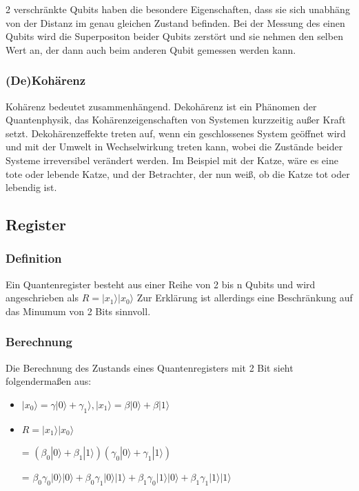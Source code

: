 2 verschränkte Qubits haben die besondere Eigenschaften, dass sie sich unabhäng von der Distanz im genau gleichen Zustand befinden. Bei der Messung des einen Qubits wird die Superpositon beider Qubits zerstört und sie nehmen den selben Wert an, der dann auch beim anderen Qubit gemessen werden kann.


\subsubsection{(De)Kohärenz}
\label{sec:Kohaerenz}

Kohärenz bedeutet zusammenhängend. Dekohärenz ist ein Phänomen der Quantenphysik, das Kohärenzeigenschaften von Systemen kurzzeitig außer Kraft setzt. Dekohärenzeffekte treten auf, wenn ein geschlossenes System geöffnet wird und mit der Umwelt in Wechselwirkung treten kann, wobei die Zustände beider Systeme irreversibel verändert werden.
Im Beispiel mit der Katze, wäre es eine tote oder lebende Katze, und der Betrachter, der nun weiß, ob die Katze tot oder lebendig ist.

\subsection{Register}
\label{sec:Register}

\subsubsection{Definition}
\label{sec:Register_Definition}

Ein Quantenregister besteht aus einer Reihe von 2 bis n Qubits und wird angeschrieben als $R = |x_1\rangle|x_0\rangle$
Zur Erklärung ist allerdings eine Beschränkung auf das Minumum von 2 Bits sinnvoll.


\subsubsection{Berechnung}
\label{sec:Berechnung}

Die Berechnung des Zustands eines Quantenregisters mit 2 Bit sieht folgendermaßen aus:
\begin{itemize}
    \item $|x_0\rangle = \gamma|0\rangle + \gamma_1\rangle, |x_1\rangle = \beta|0\rangle + \beta|1\rangle$
    \item $R = |x_1\rangle|x_0\rangle$
	\item[=] $(\beta_0|0\rangle+\beta_1|1\rangle)(\gamma_0|0\rangle+\gamma_1|1\rangle)$
	\item[=] $\beta_0\gamma_0|0\rangle|0\rangle+\beta_0\gamma_1|0\rangle|1\rangle+\beta_1\gamma_0|1\rangle|0\rangle+\beta_1\gamma_1|1\rangle|1\rangle$
\end{itemize}

